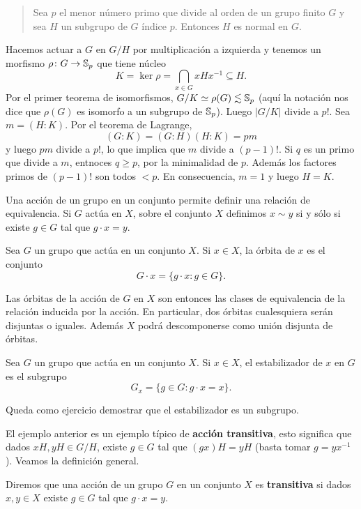 \begin{quote}
	Sea $p$ el menor número primo que divide al orden de un grupo finito  
	$G$ y sea $H$ un subgrupo de $G$ índice $p$. Entonces $H$ es normal en $G$. 
\end{quote}

Hacemos actuar a $G$ en $G/H$ por multiplicación a 
izquierda y tenemos un morfismo $\rho\colon G\to\mathbb{S}_p$ que tiene núcleo
\[
K=\ker\rho=\bigcap_{x\in G}xHx^{-1}\subseteq H.
\]
Por el primer teorema de isomorfismos, $G/K\simeq\rho(G)\lesssim\mathbb{S}_p$ (aquí la notación nos dice que $\rho(G)$ es isomorfo a un subgrupo de $\mathbb{S}_p$). Luego $|G/K|$ divide a $p!$. 
Sea $m=(H:K)$. Por el teorema de Lagrange, 
\[
(G:K)=(G:H)(H:K)=pm
\]
y luego $pm$ divide a $p!$, lo que implica que $m$ divide a $(p-1)!$. Si $q$ es un primo que divide a $m$, entnoces $q\geq p$, por la minimalidad de $p$. Además los factores primos de $(p-1)!$ son todos $<p$. En consecuencia, $m=1$ y luego $H=K$.
 

Una acción de un grupo en un conjunto permite definir una relación de equivalencia. Si $G$ actúa en $X$, sobre el conjunto $X$ 
definimos $x\sim y$ si y sólo si existe $g\in G$ tal que $g\cdot x=y$. 

\begin{definition}
Sea $G$ un grupo que actúa en un conjunto $X$. Si $x\in X$, la órbita
de $x$ es el conjunto
\[
G\cdot x=\{g\cdot x:g\in G\}.
\]	
\end{definition}

Las órbitas de la acción de $G$ en $X$ son entonces las clases de equivalencia de la relación inducida por la acción. En particular, dos órbitas cualesquiera serán disjuntas o iguales. Además $X$ podrá descomponerse como unión disjunta de órbitas.  

\begin{definition}
	Sea $G$ un grupo que actúa en un conjunto $X$. Si $x\in X$, el estabilizador de $x$ en $G$ 
	es el subgrupo 
	\[
	G_x=\{g\in G:g\cdot x=x\}.
	\]	
\end{definition}

Queda como ejercicio demostrar que el estabilizador es un subgrupo. 

El ejemplo anterior es un ejemplo típico de \textbf{acción transitiva}, 
esto significa que dados
$xH,yH\in G/H$, existe $g\in G$ tal que $(gx)H=yH$ (basta tomar $g=yx^{-1}$). Veamos la definición 
general. 

\begin{definition}
Diremos que una acción de un grupo $G$ en un conjunto $X$ 
es \textbf{transitiva} si dados $x,y\in X$ existe $g\in G$ tal que $g\cdot x=y$. 
\end{definition}

